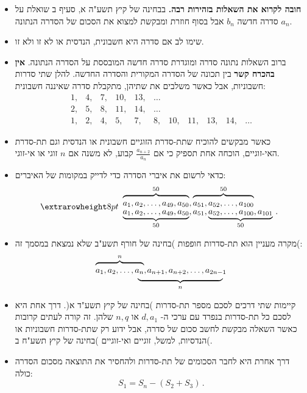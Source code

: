 \begin{itemize}


\item
\textbf{חובה לקרוא את השאלות בזהירות רבה.}
בבחינה של קיץ תשע"ה א, סעיף ב שואלת על סדרה חדשה
${b_n}$
אבל בסוף חוזרת ומבקשת למצוא את הסכום של הסדרה הנתונה
${a_n}$.

\item
שימו לב אם סדרה היא חשבונית, הנדסית או לא זו ולא זו.

\item 
ברוב השאלות נתונה סדרה ומוגדרת סדרה חדשה המובססת על הסדרה הנתונה. 
\textbf{אין בהכרח קשר}
בין תכונה של הסדרה המקורית והסדרה החדשה. להלן שתי סדרות חשבוניות, אבל כאשר משלבים את שתיהן, מתקבלת סדרה שאיננה חשבונית:
\[
\begin{array}{rrrrrrrrrrr}
1,& 4,& 7,& 10,& 13,& \ldots\\
2,& 5,& 8,& 11,& 14, &\ldots\\
1,& 2,& 4,& 5,& 7,& 8,& 10,& 11,& 13,& 14, &\ldots
\end{array}
\]
\item
כאשר מבקשים להוכיח שתת-סדרת הזוגיים חשבונית או הנדסית וגם תת-סדרת האי-זוגיים, הוכחה אחת תספיק כי אם 
$\displaystyle \frac{a_{n+2}}{a_n}$
קבוע, לא משנה אם 
$n$
זוגי או אי-זוגי.


\item
כדאי לרשום את איברי הסדרה כדי לדייק במקומות של האיברים:
\[
\setlength{\extrarowheight}{8pt}
\begin{array}{l}
\overbrace{\rule{0pt}{8pt}a_1, a_2, \ldots, a_{49}, a_{50}}^{50}, \overbrace{\rule{0pt}{8pt}a_{51}, a_{52},\ldots, a_{100}}^{50}\\
\underbrace{\rule{0pt}{8pt}a_1, a_2, \ldots, a_{49}, a_{50}}_{50}, a_{51}, \underbrace{\rule{0pt}{8pt}a_{52}, \ldots, a_{100}, a_{101}}_{50}\,.
\end{array}
\]
\vspace{-3ex}

\item
מקרה מעניין הוא תת-סדרות חופפות )בחינה של חורף תשע"ב שלא נמצאת במסמך זה(:
\[
\renewcommand{\arraystretch}{.4}
\begin{array}{ll}
\overbrace{\rule{0pt}{8pt}a_1, a_2, \ldots, a_n}^{n},&\hspace{-9pt}a_{n+1}, a_{n+2}, \ldots, a_{2n-1}\\
&\hspace{-2em}\underbrace{\rule{10em}{0pt}}_{n}
\end{array}
\]
\vspace{-4ex}
\item
קיימות שתי דרכים לסכם מספר תת-סדרות )בחינה של קיץ תשע"ד א(. דרך אחת היא לסכם כל תת-סדרות בנפרד עם ערכי ה-%
$d, a_1$
או
$n, q$
שלהן. זה קורה לעתים קרובות כאשר השאלה מבקשת לחשב סכום של סדרה, אבל ידוע רק שתת-סדרות חשבוניות או הנדסיות, למשל, זוגיים ואי-זוגיים )בחינה של קיץ תשע"ח ב(.
\item 
דרך אחרת היא לחבר הסכומים של תת-סדרות ולהחסיר את התוצאה מסכום הסדרה כולה:
\[
S_1 = S_n - (S_2+S_3)\,.
\]
\vspace{-6ex}


\end{itemize}
